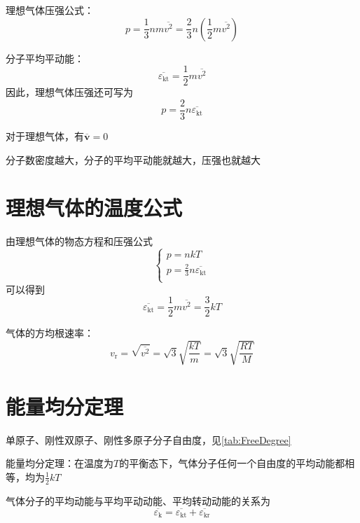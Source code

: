 \documentclass[12pt, a4paper, twoside]{ctexbook}
\begin{document}
{\sonti 理想气体压强公式}：
$$
p=\frac{1}{3}nm\overline{v^2}=\frac{2}{3}n\left(\frac{1}{2}m\overline{v^2}\right)
$$

{\sonti 分子平均平动能}：
$$
\overline{\varepsilon_\mathrm{kt}}=\frac{1}{2}m\overline{v^2}
$$
因此，理想气体压强还可写为
$$
p=\frac{2}{3}n\overline{\varepsilon_\mathrm{kt}}
$$

对于理想气体，有$\overline{\boldsymbol{v}}=0$

分子数密度越大，分子的平均平动能就越大，压强也就越大
\section{理想气体的温度公式}
由理想气体的物态方程和压强公式
$$
\left\{ \begin{array}{l}
	p=nkT\\
	p=\frac{2}{3}n\overline{\varepsilon _\mathrm{kt}}\\
\end{array} \right. 
$$
可以得到
$$
\overline{\varepsilon _\mathrm{kt}}=\frac{1}{2}m\overline{v^2}=\frac{3}{2}kT
$$

{\sonti 气体的方均根速率}：
$$
v_\mathrm{r}=\sqrt{\overline{v^2}}=\sqrt{3}\sqrt{\frac{kT}{m}}=\sqrt{3}\sqrt{\frac{RT}{M}}
$$
\section{能量均分定理}
单原子、刚性双原子、刚性多原子分子自由度，见\textcolor{blue}{\cref{tab:FreeDegree}}
\begin{table}[H]
    \centering
    \caption{单原子、刚性双原子、刚性多原子分子自由度}
    \label{tab:FreeDegree}
\end{table}

{\sonti 能量均分定理}：在温度为$T$的平衡态下，气体分子任何一个自由度的平均动能都相等，均为$\frac{1}{2}kT$

气体分子的平均动能与平均平动动能、平均转动动能的关系为
$$
\overline{\varepsilon_\mathrm{k}}=\overline{\varepsilon_\mathrm{kt}}+\overline{\varepsilon_\mathrm{kr}}
$$
\end{document}
